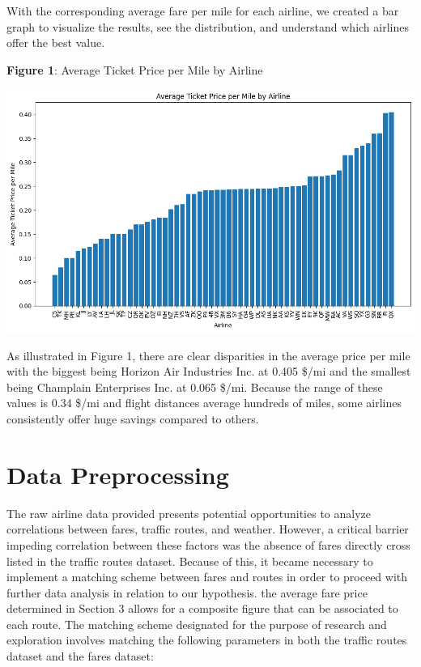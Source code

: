 \documentclass{article}
\begin{document}
With the corresponding average fare per mile for each airline, we created a bar graph to visualize the results, see the distribution, and understand which airlines offer the best value. 


\begin{center}
    \textbf{Figure 1}: Average Ticket Price per Mile by Airline
\end{center}
\includegraphics[scale=0.5]{images/AvgTicketPricePerMile.png}

As illustrated in Figure 1, there are clear disparities in the average price per mile with the biggest being Horizon Air Industries Inc. at 0.405 \$/mi and the smallest being Champlain Enterprises Inc. at 0.065 \$/mi. Because the range of these values is 0.34 \$/mi and flight distances average hundreds of miles, some airlines consistently offer huge savings compared to others. 


\section{Data Preprocessing}
The raw airline data provided presents potential opportunities to analyze correlations between fares, traffic routes, and weather. However, a critical barrier impeding correlation between these factors was the absence of fares directly cross listed in the traffic routes dataset. Because of this, it became necessary to implement a matching scheme between fares and routes in order to proceed with further data analysis in relation to our hypothesis. the average fare price determined in Section 3 allows for a composite figure that can be associated to each route. The matching scheme designated for the purpose of research and exploration involves matching the following parameters in both the traffic routes dataset and the fares dataset:
\end{document}
